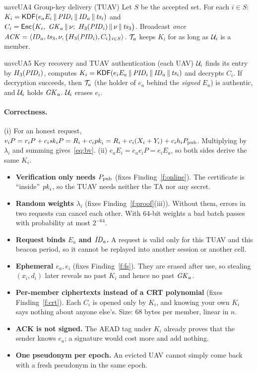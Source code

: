 \begin{stepbox}{uavc}{UA4 \;Group-key delivery (TUAV)}
Let $S$ be the accepted set. For each $i\in S$: $K_i=\mathsf{KDF}(e_aE_i\,\|\,\mathit{PID}_i\,\|\,\mathit{ID}_a\,\|\,\mathit{ts}_i)$ and
$C_i=\Enc\big(K_i,\ \GK_a\cat\nu;\ \Hd(\PID_i)\cat\nu\cat\ts_3\big)$. Broadcast \emph{once}
$\mathit{ACK}=\langle\mathit{ID}_a,\mathit{ts}_3,\nu,\{H_3(\mathit{PID}_i),C_i\}_{i\in S}\rangle$. $\mathcal{T}_a$ keeps $K_i$ for as long as $\mathcal{U}_i$ is a member.
\end{stepbox}

\begin{stepbox}{uavc}{UA5 \;Key recovery and TUAV authentication (each UAV)}
$\mathcal{U}_i$ finds its entry by $H_3(\mathit{PID}_i)$, computes $K_i=\mathsf{KDF}(e_iE_a\,\|\,\mathit{PID}_i\,\|\,\mathit{ID}_a\,\|\,\mathit{ts}_i)$ and decrypts $C_i$. If decryption succeeds, then
$\mathcal{T}_a$ (the holder of $e_a$ behind the \emph{signed} $E_a$) is authentic, and $\mathcal{U}_i$ holds $\mathit{GK}_a$. $\mathcal{U}_i$ erases $e_i$.
\end{stepbox}

\paragraph{Correctness.}
(i) For an honest request, $v_iP=r_iP+c_i\mathit{sk}_iP=R_i+c_i\mathit{pk}_i=R_i+c_i(X_i+Y_i)+c_ih_iP_{\mathrm{pub}}$. Multiplying by $\lambda_i$ and summing gives~\eqref{eq:bv}.
(ii) $e_aE_i=e_ae_iP=e_iE_a$, so both sides derive the same $K_i$.

\begin{whybox}
\begin{itemize}[leftmargin=*]
  \item \textbf{Verification only needs $P_{\mathrm{pub}}$} (fixes Finding~\ref{f:online}). The certificate is ``inside'' $\mathit{pk}_i$, so the TUAV needs neither the TA nor any secret.
  \item \textbf{Random weights $\lambda_i$} (fixes Finding~\ref{f:proof}(iii)). Without them, errors in two requests can cancel each other. With 64-bit weights a bad batch passes with probability at most $2^{-64}$.
  \item \textbf{Request binds $E_a$ and $\mathit{ID}_a$.} A request is valid only for this TUAV and this beacon period, so it cannot be replayed into another session or another cell.
  \item \textbf{Ephemeral $e_a,e_i$} (fixes Finding~\ref{f:fs}). They are erased after use, so stealing $(x_i,d_i)$ later reveals no past $K_i$ and hence no past $\mathit{GK}_a$.
  \item \textbf{Per-member ciphertexts instead of a CRT polynomial} (fixes Finding~\ref{f:crt}). Each $C_i$ is opened only by $K_i$, and knowing your own $K_i$ says nothing about anyone else's.
        Size: 68 bytes per member, linear in $n$.
  \item \textbf{ACK is not signed.} The AEAD tag under $K_i$ already proves that the sender knows $e_a$; a signature would cost more and add nothing.
  \item \textbf{One pseudonym per epoch.} An evicted UAV cannot simply come back with a fresh pseudonym in the same epoch.
\end{itemize}
\end{whybox}

